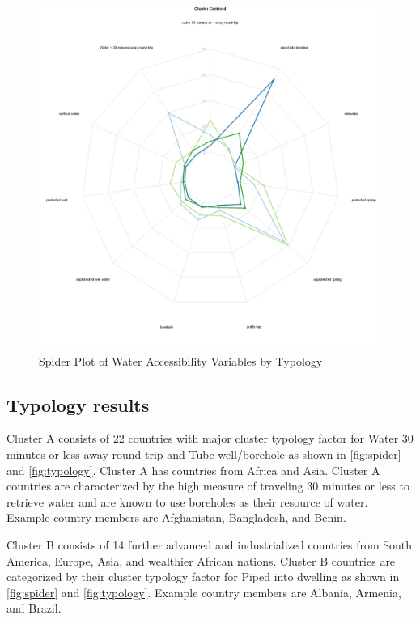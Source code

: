 \documentclass[10pt,twoside]{article}
\numberwithin{equation}{section}
\newcommand{\?}{\stackrel{?}{=}}
\begin{document}
\begin{figure}[h!]
  \centering
  \includegraphics[width= 1\textwidth]{spider-plot}
  \caption{Spider Plot of Water Accessibility Variables by Typology}
  \label{fig:spider}
\end{figure}

\subsection{Typology results}
Cluster A consists of 22 countries with major cluster typology factor for Water 30 minutes or less away round trip and Tube well/borehole as shown in \autoref{fig:spider} and \autoref{fig:typology}. Cluster A has countries from Africa and Asia. Cluster A countries are characterized by the high measure of traveling 30 minutes or less to retrieve water and are known to use boreholes as their resource of water. Example country members are Afghanistan, Bangladesh, and Benin. 

Cluster B consists of 14 further advanced and industrialized countries from South America, Europe, Asia, and wealthier African nations. Cluster B countries are categorized by their cluster typology factor for Piped into dwelling as shown in \autoref{fig:spider} and \autoref{fig:typology}. Example country members are Albania, Armenia, and Brazil. 
\end{document}
